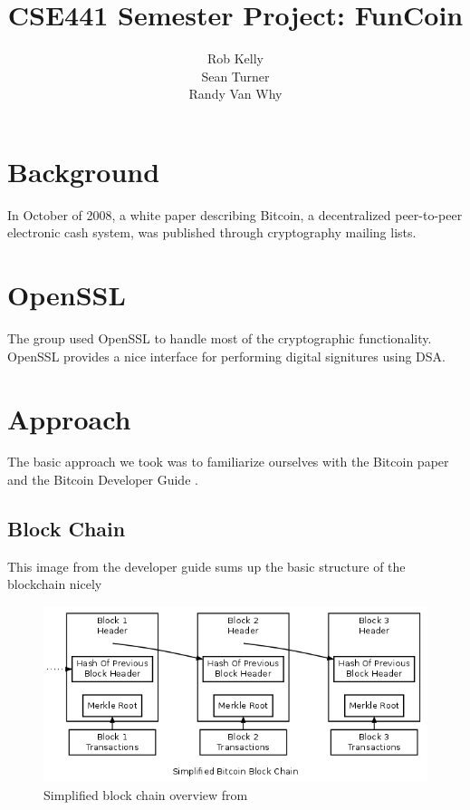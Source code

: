 \documentclass[12pt]{article}
\begin{document}
\title{CSE441 Semester Project: FunCoin}
\author{Rob Kelly\\Sean Turner\\Randy Van Why}
\maketitle

\section{Background}
In October of 2008, a white paper\cite{nakamoto:bitcoin} describing Bitcoin, a decentralized peer-to-peer electronic cash system, was published through cryptography mailing lists.

\section{OpenSSL}
The group used OpenSSL to handle most of the cryptographic functionality. OpenSSL provides a nice interface for performing digital signitures using DSA.

\section{Approach}\label{approach}
The basic approach we took was to familiarize ourselves with the Bitcoin paper\cite{nakamoto:bitcoin} and the Bitcoin Developer Guide \cite{dev:guide}. 

\subsection{Block Chain}\label{blockchain}
This image from the developer guide sums up the basic structure of the blockchain nicely 

\begin{figure}[h!]\label{figblockchain}
	\centering
	\includegraphics[scale=0.5]{en-blockchain-overview.png}
	\caption{Simplified block chain overview from \cite{dev:guide}}
\end{figure}
\end{document}
